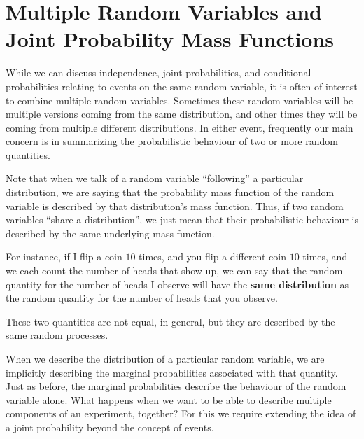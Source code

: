 \documentclass[
  letterpaper,
  DIV=11,
  numbers=noendperiod]{scrreprt}
\theoremstyle{definition}
\theoremstyle{definition}
\theoremstyle{definition}
\theoremstyle{remark}
\begin{document}
\section{Multiple Random Variables and Joint Probability Mass
Functions}\label{multiple-random-variables-and-joint-probability-mass-functions}

While we can discuss independence, joint probabilities, and conditional
probabilities relating to events on the same random variable, it is
often of interest to combine multiple random variables. Sometimes these
random variables will be multiple versions coming from the same
distribution, and other times they will be coming from multiple
different distributions. In either event, frequently our main concern is
in summarizing the probabilistic behaviour of two or more random
quantities.

\begin{tcolorbox}[enhanced jigsaw, rightrule=.15mm, leftrule=.75mm, opacitybacktitle=0.6, title={A Discussion of Distributional Language}, colframe=quarto-callout-note-color-frame, opacityback=0, coltitle=black, breakable, toptitle=1mm, colbacktitle=quarto-callout-note-color!10!white, bottomtitle=1mm, titlerule=0mm, arc=.35mm, colback=white, toprule=.15mm, left=2mm, bottomrule=.15mm]

Note that when we talk of a random variable ``following'' a particular
distribution, we are saying that the probability mass function of the
random variable is described by that distribution's mass function. Thus,
if two random variables ``share a distribution'', we just mean that
their probabilistic behaviour is described by the same underlying mass
function.

For instance, if I flip a coin \(10\) times, and you flip a different
coin \(10\) times, and we each count the number of heads that show up,
we can say that the random quantity for the number of heads I observe
will have the \textbf{same distribution} as the random quantity for the
number of heads that you observe.

These two quantities are not equal, in general, but they are described
by the same random processes.

\end{tcolorbox}

When we describe the distribution of a particular random variable, we
are implicitly describing the marginal probabilities associated with
that quantity. Just as before, the marginal probabilities describe the
behaviour of the random variable alone. What happens when we want to be
able to describe multiple components of an experiment, together? For
this we require extending the idea of a joint probability beyond the
concept of events.
\end{document}
